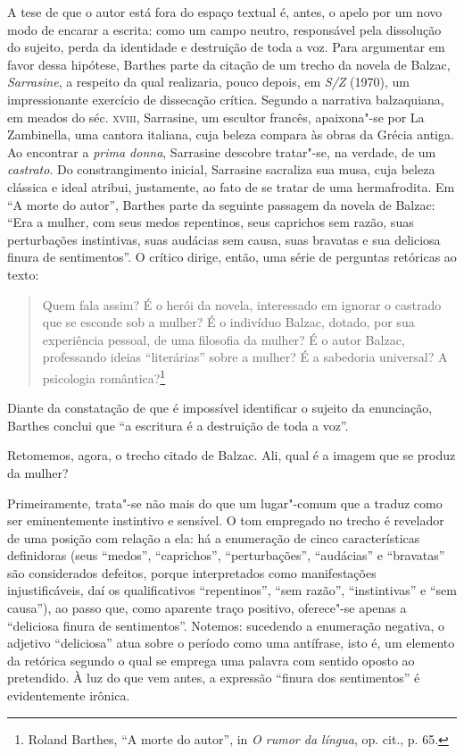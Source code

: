 A tese de que o autor está fora do espaço textual é, antes, o apelo por
um novo modo de encarar a escrita: como um campo neutro, responsável
pela dissolução do sujeito, perda da identidade e destruição de toda a
voz. Para argumentar em favor dessa hipótese, Barthes parte da citação
de um trecho da novela de Balzac, \emph{Sarrasine}, a respeito da qual
realizaria, pouco depois, em \emph{S/Z} (1970), um impressionante exercício de
dissecação crítica. Segundo a narrativa balzaquiana, em meados do séc.
\textsc{xviii}, Sarrasine, um escultor francês, apaixona"-se por La
Zambinella, uma cantora italiana, cuja beleza compara às obras da Grécia
antiga. Ao encontrar a \emph{prima donna}, Sarrasine descobre tratar"-se, na
verdade, de um \emph{castrato}. Do constrangimento inicial, Sarrasine sacraliza
sua musa, cuja beleza clássica e ideal atribui, justamente, ao fato de
se tratar de uma hermafrodita. Em ``A morte do autor'', Barthes parte da
seguinte passagem da novela de Balzac: ``Era a mulher, com seus medos
repentinos, seus caprichos sem razão, suas perturbações instintivas,
suas audácias sem causa, suas bravatas e sua deliciosa finura de
sentimentos''. O crítico dirige, então, uma série de perguntas retóricas
ao texto:

\begin{quote}
Quem fala assim? É o herói da novela, interessado em ignorar o castrado
que se esconde sob a mulher? É o indivíduo Balzac, dotado, por sua
experiência pessoal, de uma filosofia da mulher? É o autor Balzac,
professando ideias ``literárias'' sobre a mulher? É a sabedoria
universal? A psicologia romântica?\footnote{Roland Barthes, ``A morte do
  autor'', in \emph{O rumor da língua}, op. cit., p. 65.}
\end{quote}

Diante da constatação de que é impossível identificar o sujeito da
enunciação, Barthes conclui que ``a escritura é a destruição de toda a
voz''.

Retomemos, agora, o trecho citado de Balzac. Ali, qual é a imagem que se
produz da mulher?

Primeiramente, trata"-se não mais do que um lugar"-comum que a traduz como
ser eminentemente instintivo e sensível. O tom empregado no trecho é
revelador de uma posição com relação a ela: há a enumeração de cinco
características definidoras (seus ``medos'', ``caprichos'',
``perturbações'', ``audácias'' e ``bravatas'' são considerados defeitos,
porque interpretados como manifestações injustificáveis, daí os
qualificativos ``repentinos'', ``sem razão'', ``instintivas'' e ``sem
causa''), ao passo que, como aparente traço positivo, oferece"-se apenas
a ``deliciosa finura de sentimentos''. Notemos: sucedendo a enumeração
negativa, o adjetivo ``deliciosa'' atua sobre o período como uma
antífrase, isto é, um elemento da retórica segundo o qual se emprega uma
palavra com sentido oposto ao pretendido. À luz do que vem antes, a
expressão ``finura dos sentimentos'' é evidentemente irônica.


